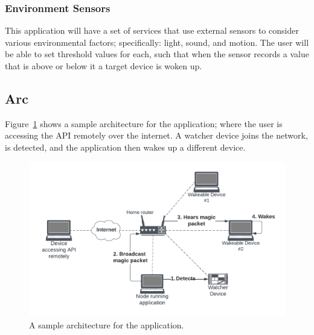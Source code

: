 \vspace{2mm}
\subsubsection{Environment Sensors}

This application will have a set of services that use external sensors to consider various environmental factors; specifically: light, sound, and motion. The user will be able to set threshold values for each, such that when the sensor records a value that is above or below it a target device is woken up.

\subsection{Arc}

Figure~\ref{fig:architecture} shows a sample architecture for the application; where the user is accessing the API remotely over the internet. A watcher device joins the network, is detected, and the application then wakes up a different device.

\begin{figure}[ht]
    \centering
    \includegraphics[width=\columnwidth]{assets/architecture.png}
    \caption{A sample architecture for the application.}
    \label{fig:architecture}
\end{figure}